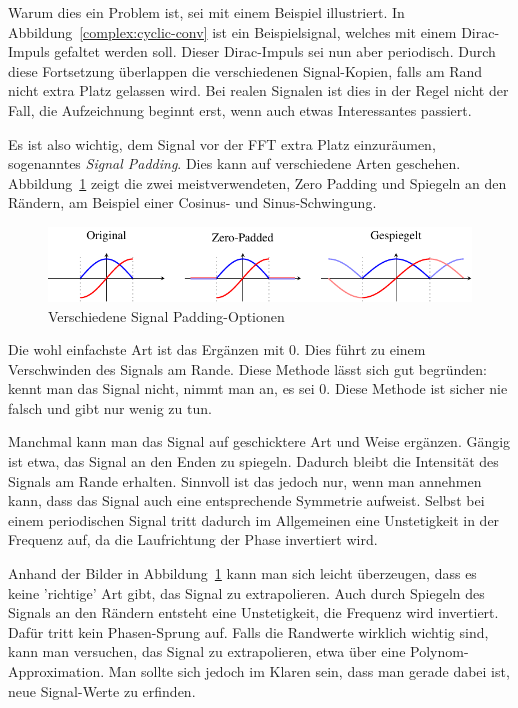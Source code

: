 Warum dies ein Problem ist, sei mit einem Beispiel illustriert.
In Abbildung~\ref{complex:cyclic-conv} ist ein Beispielsignal, welches mit einem Dirac-Impuls gefaltet werden soll.
Dieser Dirac-Impuls sei nun aber periodisch.
Durch diese Fortsetzung überlappen die verschiedenen Signal-Kopien, falls am Rand nicht extra Platz gelassen wird.
Bei realen Signalen ist dies in der Regel nicht der Fall, die Aufzeichnung beginnt erst, wenn auch etwas Interessantes passiert.

Es ist also wichtig, dem Signal vor der FFT extra Platz einzuräumen, sogenanntes \emph{Signal Padding}.
%
Dies kann auf verschiedene Arten geschehen.
Abbildung~\ref{complex:padding} zeigt die zwei meistverwendeten, Zero Padding und Spiegeln an den Rändern, am Beispiel einer Cosinus- und Sinus-Schwingung.
\begin{figure}
	\centering
	\includegraphics{papers/complex/images/signal_padding.pdf}
	\caption{Verschiedene Signal Padding-Optionen}
	\label{complex:padding}
\end{figure}

Die wohl einfachste Art ist das Ergänzen mit $0$.
Dies führt zu einem Verschwinden des Signals am Rande.
Diese Methode lässt sich gut begründen: kennt man das Signal nicht, nimmt man an, es sei $0$.
Diese Methode ist sicher nie falsch und gibt nur wenig zu tun.

Manchmal kann man das Signal auf geschicktere Art und Weise ergänzen.
Gängig ist etwa, das Signal an den Enden zu spiegeln.
Dadurch bleibt die Intensität des Signals am Rande erhalten.
Sinnvoll ist das jedoch nur, wenn man annehmen kann, dass das Signal auch eine entsprechende Symmetrie aufweist.
Selbst bei einem periodischen Signal tritt dadurch im Allgemeinen eine Unstetigkeit in der Frequenz auf, da die Laufrichtung der Phase invertiert wird.

Anhand der Bilder in Abbildung~\ref{complex:padding} kann man sich leicht überzeugen, dass es keine 'richtige' Art gibt, das Signal zu extrapolieren.
Auch durch Spiegeln des Signals an den Rändern entsteht eine Unstetigkeit, die Frequenz wird invertiert. Dafür tritt kein Phasen-Sprung auf.
Falls die Randwerte wirklich wichtig sind, kann man versuchen, das Signal zu extrapolieren, etwa über eine Polynom-Approximation.
Man sollte sich jedoch im Klaren sein, dass man gerade dabei ist, neue Signal-Werte zu erfinden.

